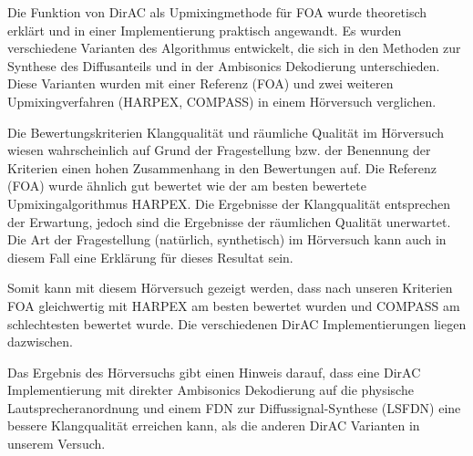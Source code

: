 Die Funktion von DirAC als Upmixingmethode für FOA wurde theoretisch erklärt und in einer Implementierung praktisch angewandt. Es wurden verschiedene Varianten des Algorithmus entwickelt, die sich in den Methoden zur Synthese des Diffusanteils und in der Ambisonics Dekodierung unterschieden. Diese Varianten wurden mit einer Referenz (FOA) und zwei weiteren Upmixingverfahren (HARPEX, COMPASS) in einem Hörversuch verglichen.

Die Bewertungskriterien Klangqualität und räumliche Qualität im Hörversuch wiesen wahrscheinlich auf Grund der Fragestellung bzw. der Benennung der Kriterien einen hohen Zusammenhang in den Bewertungen auf. Die Referenz (FOA) wurde ähnlich gut bewertet wie der am besten bewertete Upmixingalgorithmus HARPEX. Die Ergebnisse der Klangqualität entsprechen der Erwartung, jedoch sind die Ergebnisse der räumlichen Qualität unerwartet. Die Art der Fragestellung (natürlich, synthetisch) im Hörversuch kann auch in diesem Fall eine Erklärung für dieses Resultat sein.

Somit kann mit diesem Hörversuch gezeigt werden, dass nach unseren Kriterien FOA gleichwertig mit HARPEX am besten bewertet wurden und COMPASS am schlechtesten bewertet wurde. Die verschiedenen DirAC Implementierungen liegen dazwischen.

Das Ergebnis des Hörversuchs gibt einen Hinweis darauf, dass eine DirAC Implementierung mit direkter Ambisonics Dekodierung auf die physische Lautsprecheranordnung und einem FDN zur Diffussignal-Synthese (LSFDN) eine bessere Klangqualität erreichen kann, als die anderen DirAC Varianten in unserem Versuch.
